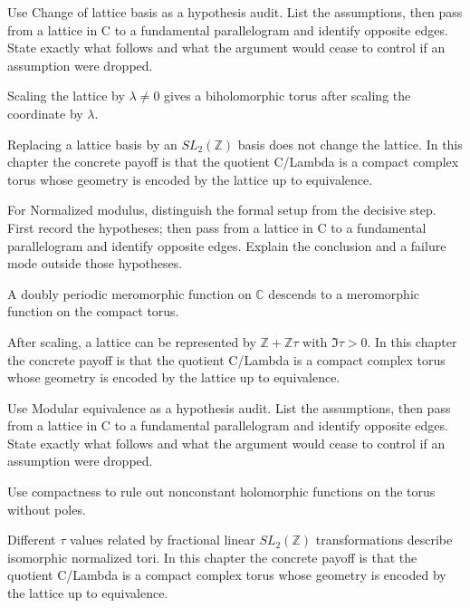\begin{exercise}\label{exr:iv27-05}
Use Change of lattice basis as a hypothesis audit. List the assumptions, then pass from a lattice in C to a fundamental parallelogram and identify opposite edges. State exactly what follows and what the argument would cease to control if an assumption were dropped.
\end{exercise}
\begin{hint}
Scaling the lattice by \(\lambda\ne0\) gives a biholomorphic torus after scaling the coordinate by \(\lambda\).
\end{hint}
\begin{solution}
Replacing a lattice basis by an $SL_2(\mathbb Z)$ basis does not change the lattice. In this chapter the concrete payoff is that the quotient C/Lambda is a compact complex torus whose geometry is encoded by the lattice up to equivalence.
\end{solution}

\begin{exercise}\label{exr:iv27-06}
For Normalized modulus, distinguish the formal setup from the decisive step. First record the hypotheses; then pass from a lattice in C to a fundamental parallelogram and identify opposite edges. Explain the conclusion and a failure mode outside those hypotheses.
\end{exercise}
\begin{hint}
A doubly periodic meromorphic function on \(\mathbb C\) descends to a meromorphic function on the compact torus.
\end{hint}
\begin{solution}
After scaling, a lattice can be represented by $\mathbb Z+\mathbb Z\tau$ with $\Im\tau>0$. In this chapter the concrete payoff is that the quotient C/Lambda is a compact complex torus whose geometry is encoded by the lattice up to equivalence.
\end{solution}

\begin{exercise}\label{exr:iv27-07}
Use Modular equivalence as a hypothesis audit. List the assumptions, then pass from a lattice in C to a fundamental parallelogram and identify opposite edges. State exactly what follows and what the argument would cease to control if an assumption were dropped.
\end{exercise}
\begin{hint}
Use compactness to rule out nonconstant holomorphic functions on the torus without poles.
\end{hint}
\begin{solution}
Different $\tau$ values related by fractional linear $SL_2(\mathbb Z)$ transformations describe isomorphic normalized tori. In this chapter the concrete payoff is that the quotient C/Lambda is a compact complex torus whose geometry is encoded by the lattice up to equivalence.
\end{solution}

